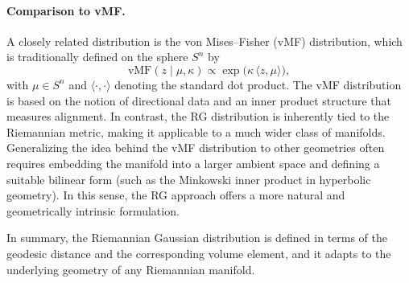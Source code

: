 \paragraph{Comparison to vMF.} A closely related distribution is the von Mises--Fisher (vMF) distribution, which is traditionally defined on the sphere $S^n$ by
\[
\text{vMF}(z \mid \mu, \kappa) \propto \exp\!\bigl(\kappa\,\langle z,\mu\rangle\bigr),
\]
with $\mu\in S^n$ and $\langle \cdot, \cdot \rangle$ denoting the standard dot product. The vMF distribution is based on the notion of directional data and an inner product structure that measures alignment. In contrast, the RG distribution is inherently tied to the Riemannian metric, making it applicable to a much wider class of manifolds. Generalizing the idea behind the vMF distribution to other geometries often requires embedding the manifold into a larger ambient space and defining a suitable bilinear form (such as the Minkowski inner product in hyperbolic geometry). In this sense, the RG approach offers a more natural and geometrically intrinsic formulation.

In summary, the Riemannian Gaussian distribution is defined in terms of the geodesic distance and the corresponding volume element, and it adapts to the underlying geometry of any Riemannian manifold.